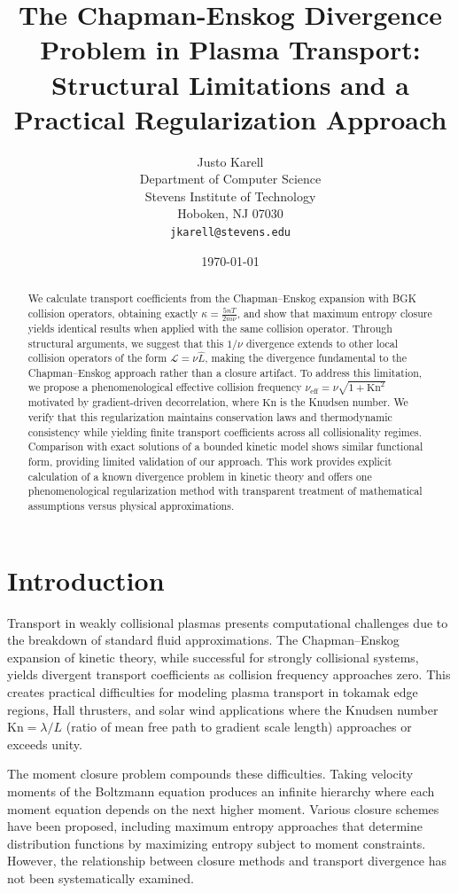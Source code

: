 \documentclass[12pt,a4paper]{article}
\title{The Chapman-Enskog Divergence Problem in Plasma Transport:\\
Structural Limitations and a Practical Regularization Approach}
\author{Justo Karell\\
Department of Computer Science\\
Stevens Institute of Technology\\
Hoboken, NJ 07030\\
\texttt{jkarell@stevens.edu}}
\date{\today}
\newcommand{\Kn}{\text{Kn}}
\newcommand{\eff}{\text{eff}}
\begin{document}
\maketitle

\begin{abstract}
We calculate transport coefficients from the Chapman--Enskog expansion with BGK collision operators, obtaining exactly $\kappa = \frac{5nT}{2m\nu}$, and show that maximum entropy closure yields identical results when applied with the same collision operator. Through structural arguments, we suggest that this $1/\nu$ divergence extends to other local collision operators of the form $\mathcal{L} = \nu\hat{L}$, making the divergence fundamental to the Chapman--Enskog approach rather than a closure artifact. To address this limitation, we propose a phenomenological effective collision frequency $\nu_{\eff} = \nu\sqrt{1 + \Kn^2}$ motivated by gradient-driven decorrelation, where $\Kn$ is the Knudsen number. We verify that this regularization maintains conservation laws and thermodynamic consistency while yielding finite transport coefficients across all collisionality regimes. Comparison with exact solutions of a bounded kinetic model shows similar functional form, providing limited validation of our approach. This work provides explicit calculation of a known divergence problem in kinetic theory and offers one phenomenological regularization method with transparent treatment of mathematical assumptions versus physical approximations.
\end{abstract}

\section{Introduction}

Transport in weakly collisional plasmas presents computational challenges due to the breakdown of standard fluid approximations. The Chapman--Enskog expansion of kinetic theory, while successful for strongly collisional systems, yields divergent transport coefficients as collision frequency approaches zero. This creates practical difficulties for modeling plasma transport in tokamak edge regions, Hall thrusters, and solar wind applications where the Knudsen number $\Kn = \lambda/L$ (ratio of mean free path to gradient scale length) approaches or exceeds unity.

The moment closure problem compounds these difficulties. Taking velocity moments of the Boltzmann equation produces an infinite hierarchy where each moment equation depends on the next higher moment. Various closure schemes have been proposed, including maximum entropy approaches that determine distribution functions by maximizing entropy subject to moment constraints. However, the relationship between closure methods and transport divergence has not been systematically examined.
\end{document}
